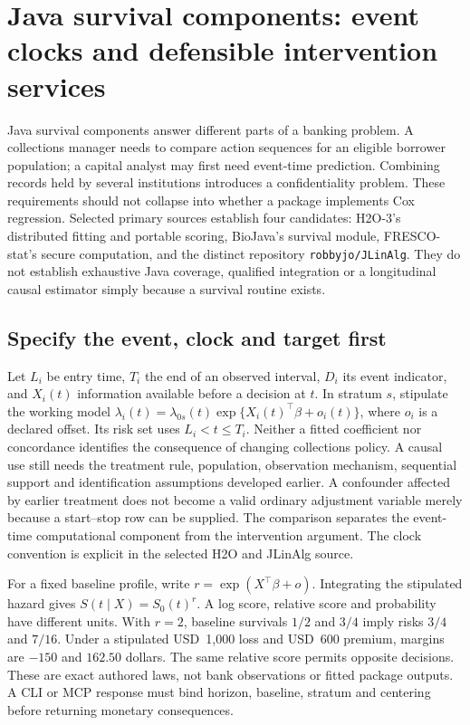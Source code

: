 \section{Java survival components: event clocks and defensible intervention services}
\label{sec:exec24-longitudinal-java}
Java survival components answer different parts of a banking problem. A
collections manager needs to compare action sequences for an eligible borrower
population; a capital analyst may first need event-time prediction. Combining
records held by several institutions introduces a confidentiality problem.
These requirements should not collapse into whether a package implements Cox
regression. Selected primary sources establish four candidates: H2O-3's
distributed fitting and portable scoring, BioJava's survival module,
FRESCO-stat's secure computation, and the distinct repository
\texttt{robbyjo/JLinAlg}. They do not establish exhaustive Java coverage,
qualified integration or a longitudinal causal estimator simply because a
survival routine exists.
\citep{exec24_longjava_h2o,exec24_longjava_biojava,exec24_longjava_fresco,exec24_longjava_jlinalg}

\subsection{Specify the event, clock and target first}
Let $L_i$ be entry time, $T_i$ the end of an observed interval, $D_i$ its
event indicator, and $X_i(t)$ information available before a decision at
$t$. In stratum $s$, stipulate the working model
$\lambda_i(t)=\lambda_{0s}(t)\exp\{X_i(t)^\top\beta+o_i(t)\}$, where
$o_i$ is a declared offset. Its risk set uses $L_i<t\leq T_i$. Neither
a fitted coefficient nor concordance identifies the consequence of changing
collections policy. A causal use still needs the treatment rule, population,
observation mechanism, sequential support and identification assumptions
developed earlier. A confounder affected by earlier treatment does not become
a valid ordinary adjustment variable merely because a start--stop row can
be supplied. The comparison separates the event-time computational component
from the intervention argument. The clock convention is explicit in the
selected H2O and JLinAlg source. \citep{exec24_longjava_h2o,exec24_longjava_jlinalg}

For a fixed baseline profile, write $r=\exp(X^\top\beta+o)$.
Integrating the stipulated hazard gives $S(t\mid X)=S_0(t)^r$.
A log score, relative score and probability have different units. With
$r=2$, baseline survivals $1/2$ and $3/4$ imply risks $3/4$ and $7/16$.
Under a stipulated USD~1,000 loss and USD~600 premium, margins are
$-150$ and $162.50$ dollars. The same relative score permits opposite
decisions. These are exact authored laws, not bank observations or fitted
package outputs. A CLI or MCP response must bind horizon, baseline, stratum
and centering before returning monetary consequences.
\citep{exec24_longjava_reference}

